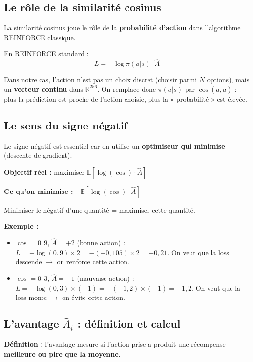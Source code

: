 \documentclass[11pt,a4paper]{article}
\begin{document}
\subsection{Le rôle de la similarité cosinus}

La similarité cosinus joue le rôle de la \textbf{probabilité d'action} dans l'algorithme REINFORCE classique.

En REINFORCE standard :
\begin{equation}
L = -\log \pi(a|s) \cdot \hat{A}
\end{equation}

Dans notre cas, l'action n'est pas un choix discret (choisir parmi $N$ options), mais un \textbf{vecteur continu} dans $\mathbb{R}^{256}$. On remplace donc $\pi(a|s)$ par $\cos(\hat{a}, a)$ : plus la prédiction est proche de l'action choisie, plus la « probabilité » est élevée.

\subsection{Le sens du signe négatif}

Le signe négatif est essentiel car on utilise un \textbf{optimiseur qui minimise} (descente de gradient).

\textbf{Objectif réel :} maximiser $\mathbb{E}[\log(\cos) \cdot \hat{A}]$

\textbf{Ce qu'on minimise :} $-\mathbb{E}[\log(\cos) \cdot \hat{A}]$

Minimiser le négatif d'une quantité = maximiser cette quantité.

\textbf{Exemple :}
\begin{itemize}
    \item $\cos = 0{,}9$, $\hat{A} = +2$ (bonne action) : $L = -\log(0{,}9) \times 2 = -(-0{,}105) \times 2 = -0{,}21$. On veut que la loss descende $\rightarrow$ on renforce cette action.
    \item $\cos = 0{,}3$, $\hat{A} = -1$ (mauvaise action) : $L = -\log(0{,}3) \times (-1) = -(-1{,}2) \times (-1) = -1{,}2$. On veut que la loss monte $\rightarrow$ on évite cette action.
\end{itemize}

\subsection{L'avantage $\hat{A}_i$ : définition et calcul}

\textbf{Définition :} l'avantage mesure si l'action prise a produit une récompense \textbf{meilleure ou pire que la moyenne}.
\end{document}
